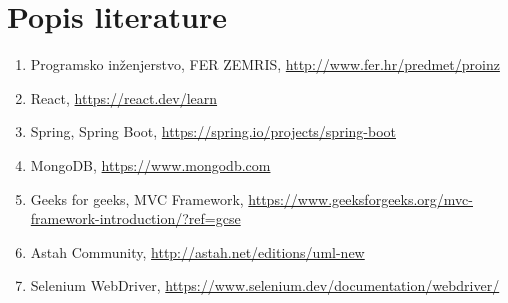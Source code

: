 \chapter*{Popis literature}
	 	
	
		
		
		\begin{enumerate}
			
			
			\item  Programsko inženjerstvo, FER ZEMRIS, \url{http://www.fer.hr/predmet/proinz}
			
			\item  React, \url{https://react.dev/learn}
			
			\item  Spring,  Spring Boot,  \url{https://spring.io/projects/spring-boot}
			
			\item  MongoDB, \url{https://www.mongodb.com}
			
			\item  Geeks for geeks, MVC Framework, \url{https://www.geeksforgeeks.org/mvc-framework-introduction/?ref=gcse}
			
			\item  Astah Community, \url{http://astah.net/editions/uml-new}
			
			\item  Selenium WebDriver, \url{https://www.selenium.dev/documentation/webdriver/}
		\end{enumerate}
		
		 